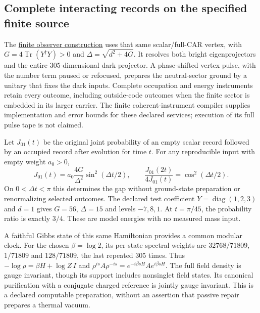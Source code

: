 \subsection{Complete interacting records on the specified finite source}

The \href{https://github.com/FloatingPragma/observer-patch-holography/blob/main/model/particle_observer_outputs/README.md}{finite observer construction}
uses that same scalar/full-CAR vertex, with
$G=4\operatorname{Tr}(Y^\dagger Y)>0$ and
$\Delta=\sqrt{d^2+4G}$. It resolves both bright eigenprojectors and the
entire 305-dimensional dark projector. A phase-shifted vertex pulse,
with the number term paused or refocused, prepares the neutral-sector
ground by a unitary that fixes the dark inputs. Complete occupation and
energy instruments retain every outcome, including outside-code outcomes
when the finite sector is embedded in its larger carrier. The finite
coherent-instrument compiler supplies implementation and error bounds
for these declared services; execution of its full pulse tape is not
claimed.

Let $J_{01}(t)$ be the original joint probability of an empty scalar
record followed by an occupied record after evolution for time $t$.
For any reproducible input with empty weight $a_0>0$,
\[
 J_{01}(t)=a_0\frac{4G}{\Delta^2}\sin^2(\Delta t/2),\qquad
 \frac{J_{01}(2t)}{4J_{01}(t)}=\cos^2(\Delta t/2).
\]
On $0<\Delta t<\pi$ this determines the gap without ground-state
preparation or renormalizing selected outcomes. The declared test
coefficient $Y=\operatorname{diag}(1,2,3)$ and $d=1$ gives $G=56$,
$\Delta=15$ and levels $-7,8,1$. At $t=\pi/45$, the probability ratio
is exactly $3/4$. These are model energies with no measured mass input.

A faithful Gibbs state of this same Hamiltonian provides a common
modular clock. For the chosen $\beta=\log2$, its per-state spectral
weights are $32768/71809$, $1/71809$ and $128/71809$, the last repeated
305 times. Thus $-\log\rho=\beta H+\log Z\,I$ and
$\rho^{is}A\rho^{-is}=e^{-i\beta sH}Ae^{i\beta sH}$.
The full field density is gauge invariant, though its support includes
nonsinglet field states. Its canonical purification with a conjugate
charged reference is jointly gauge invariant. This is a declared
computable preparation, without an assertion that passive repair prepares
a thermal vacuum.

